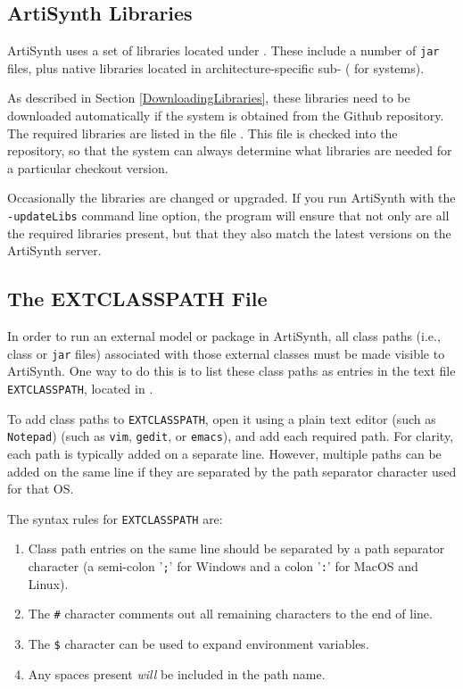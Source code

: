 \subsection{ArtiSynth Libraries}

ArtiSynth uses a set of libraries located under
.  These include a number of {\tt jar}
files, plus native libraries located in architecture-specific
sub-\directories{} ({\tt \ARCH{}} for \FULLSYSTEM{} systems).

As described in Section \ref{DownloadingLibraries}, these libraries
need to be downloaded automatically if the system is obtained from the
Github repository. The required libraries are listed in the file
. This file is checked
into the repository, so that the system can always determine what
libraries are needed for a particular checkout version.

Occasionally the libraries are changed or upgraded.  If you run
ArtiSynth with the {\tt -updateLibs} command line option, the program
will ensure that not only are all the required libraries present, but
that they also match the latest versions on the ArtiSynth server.

\subsection{The EXTCLASSPATH File}
\label{EXTCLASSPATHFile}

In order to run an external model or package in ArtiSynth, all class
paths (i.e., class \directories{} or {\tt jar} files) associated with
those external classes must be made visible to ArtiSynth. One way to
do this is to list these class paths as entries in the text file {\tt
EXTCLASSPATH}, located in \ArtHome[].

To add class paths to {\tt EXTCLASSPATH}, open it using a
plain text editor
\ifWindows
(such as {\tt Notepad})
\else
(such as {\tt vim}, {\tt gedit}, or {\tt emacs}),
\fi
and add each required path. For clarity, each path is typically
added on a separate line. However, multiple paths can be
added on the same line if they are separated by the
path separator character used for that OS.

The syntax rules for {\tt EXTCLASSPATH} are:

\begin{enumerate}

\item Class path entries on the same line should be separated by a
path separator character (a semi-colon '{\tt ;}' for Windows
and a colon '{\tt :}' for MacOS and Linux).

\item The {\tt \#} character comments out all remaining characters
to the end of line.

\item The {\tt \$} character can be used to expand environment variables.

\item Any spaces present {\it will} be included in the path name.

\end{enumerate}

